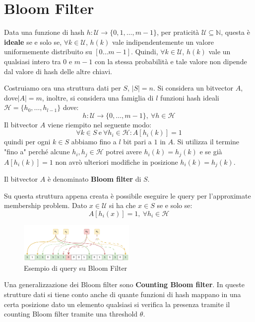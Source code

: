 \section{Bloom Filter}
\begin{definizione} 
    Data una funzione di hash $h : \mathcal{U} \to \{0, 1, \dots, m - 1\}$, per
    praticità $\mathcal{U} \subseteq \mathbb{N}$, questa è \textbf{ideale} se e
    solo se, $\forall k \in \mathcal{U}$, $h(k)$ vale indipendentemente un valore
    uniformemente distribuito su $[0 \dots m - 1]$. Quindi, $\forall k \in
        \mathcal{U}$, $h(k)$ vale un qualsiasi intero tra $0$ e $m - 1$ con la
    stessa probabilità e tale valore non dipende dal valore di hash delle altre
    chiavi.
\end{definizione}
Costruiamo ora una struttura dati per $S$, $|S| = n$. Si considera un bitvector
$A$, dove$|A| = m$, inoltre, si considera una famiglia di $l$ funzioni hash
ideali $\mathcal{H} = \{h_0, \dots, h_{l - 1}\}$ dove:
\begin{equation}
    h: \mathcal{U} \to \{0, \dots, m - 1\}, \ \forall h \in \mathcal{H}
\end{equation}
Il bitvector $A$ viene riempito nel seguente modo:
\begin{equation}
    \forall k \in S \ \text{e} \ \forall h_i \in \mathcal{H}: A[h_i(k)] = 1
\end{equation}
quindi per ogni $k \in S$ abbiamo fino a $l$ bit pari a $1$ in $A$. Si utilizza
il termine "fino a" perché alcune $h_i, h_j \in \mathcal{H}$ potrei avere
$h_i(k) = h_j(k)$ e se già $A[h_i(k)] = 1$ non avrò ulteriori modifiche in
posizione $h_i(k) = h_j(k)$.

Il bitvector $A$ è denominato \textbf{Bloom filter} di $S$.

Su questa struttura appena creata è possibile eseguire le query per l'approximate
membership problem. Dato $x \in \mathcal{U}$ si ha che $x \in S$ se e solo se:
\begin{equation}
    A[h_i(x)] = 1, \ \forall h_i \in \mathcal{H}
\end{equation}
\begin{figure}[!ht]
    \centering
    \includegraphics[width=0.5\textwidth]{img/hash/bloom.png}
    \caption{Esempio di query su Bloom Filter}
\end{figure}
\newpage
Una generalizzazione dei Bloom filter sono \textbf{Counting Bloom filter}. In
queste strutture dati si tiene conto anche di quante funzioni di hash mappano in
una certa posizione dato un elemento qualsiasi si verifica la presenza tramite
il counting Bloom filter tramite una threshold $\theta$.

